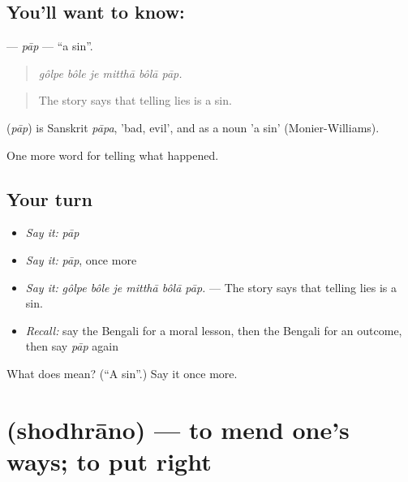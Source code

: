 \subsection*{You'll want to know: }
\textbf{} — \emph{pāp} — \textquotedblleft{}a sin\textquotedblright{}.

\begin{quote}
     
\end{quote}

\begin{quote}
\emph{gôlpe bôle je mitthā bôlā pāp.}
\end{quote}

\begin{quote}
The story says that telling lies is a sin.
\end{quote}

\begin{cousinweb}
\textbf{} (\emph{pāp}) is Sanskrit \emph{pāpa}, 'bad, evil', and as a noun 'a sin' (Monier-Williams).
\end{cousinweb}

\begin{grammarlens}[title={What you've built}]
One more word for telling what happened.
\end{grammarlens}

\subsection*{Your turn}
\begin{itemize}
\raggedright
  \item \emph{Say it:} \emph{pāp}
  \item \emph{Say it:} \emph{pāp}, once more
  \item \emph{Say it:} \emph{gôlpe bôle je mitthā bôlā pāp.} — The story says that telling lies is a sin.
  \item \emph{Recall:} say the Bengali for a moral lesson, then the Bengali for an outcome, then say \emph{pāp} again
\end{itemize}

\begin{tcolorbox}[breakable,colback=teal!4,colframe=teal!35!black,title={Before you move on}]
What does  mean? (\textquotedblleft{}A sin\textquotedblright{}.) Say it once more.
\end{tcolorbox}
\section[\texorpdfstring{\bn{শোধরানো} (shodhrāno)}{শোধরানো (shodhrāno)}]{ (shodhrāno) — to mend one's ways; to put right}

